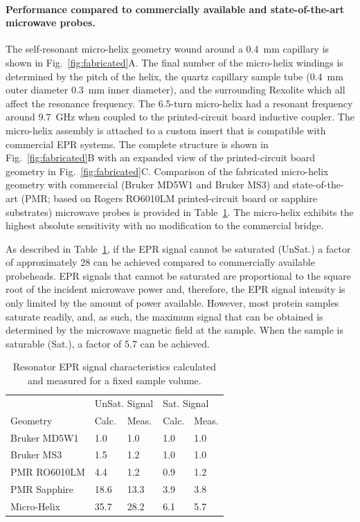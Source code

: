 \paragraph{Performance compared to commercially available and state-of-the-art microwave probes.}
The self-resonant micro-helix geometry wound around a 0.4~mm capillary is shown in Fig.~\ref{fig:fabricated}A. The final number of the micro-helix windings is determined by the pitch of the helix, the quartz capillary sample tube (0.4~mm outer diameter 0.3~mm inner diameter), and the surrounding Rexolite which all affect the resonance frequency. The 6.5-turn micro-helix had a resonant frequency around 9.7~GHz when coupled to the printed-circuit board inductive coupler. The micro-helix assembly is attached to a custom insert that is compatible with commercial EPR systems. The complete structure is shown in Fig.~\ref{fig:fabricated}B with an expanded view of the printed-circuit board geometry in Fig.~\ref{fig:fabricated}C. Comparison of the fabricated micro-helix geometry with commercial (Bruker MD5W1 and Bruker MS3) and state-of-the-art (PMR; based on Rogers RO6010LM printed-circuit board or sapphire substrates) microwave probes is provided in Table~\ref{table:signal}. The micro-helix exhibits the highest absolute sensitivity with no modification to the commercial bridge. 

As described in Table~\ref{table:signal}, if the EPR signal cannot be saturated (UnSat.) a factor of approximately 28 can be achieved compared to commercially available probeheads. EPR signals that cannot be saturated are proportional to the square root of the incident microwave power and, therefore, the EPR signal intensity is only limited by the amount of power available. However, most protein samples saturate readily, and, as such, the maximum signal that can be obtained is determined by the microwave magnetic field at the sample. When the sample is saturable (Sat.), a factor of 5.7 can be achieved. 

\begin{table}[htbp]
\centering
\caption[Resonator EPR signal characteristics calculated and measured.]{Resonator EPR signal characteristics calculated and measured for a fixed sample volume.}
\label{table:signal}
\begin{tabular}{l|l|l|l|l}
 & \multicolumn{2}{l|}{UnSat. Signal} & \multicolumn{2}{l}{Sat. Signal}\\
Geometry & Calc. & Meas. & Calc. & Meas.\\ \hline \hline
Bruker MD5W1 & 1.0 & 1.0 & 1.0 & 1.0 \\ \hline
Bruker MS3 & 1.5 & 1.2 & 1.0 & 1.0 \\ \hline
PMR RO6010LM & 4.4 & 1.2 & 0.9 & 1.2 \\ \hline
PMR Sapphire & 18.6 & 13.3 & 3.9 & 3.8 \\ \hline
Micro-Helix & 35.7 & 28.2 & 6.1 & 5.7 \\
\end{tabular}
\end{table}

